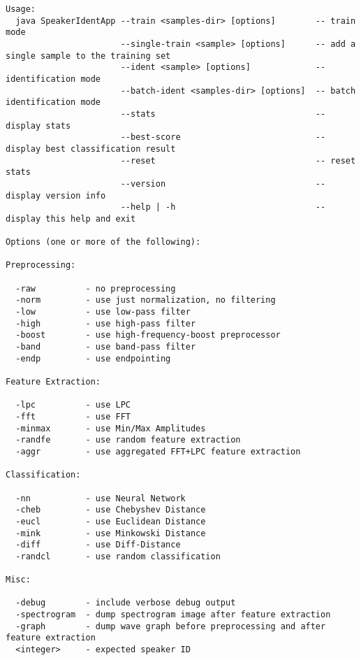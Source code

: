\begin{verbatim}
Usage:
  java SpeakerIdentApp --train <samples-dir> [options]        -- train mode
                       --single-train <sample> [options]      -- add a single sample to the training set
                       --ident <sample> [options]             -- identification mode
                       --batch-ident <samples-dir> [options]  -- batch identification mode
                       --stats                                -- display stats
                       --best-score                           -- display best classification result
                       --reset                                -- reset stats
                       --version                              -- display version info
                       --help | -h                            -- display this help and exit

Options (one or more of the following):

Preprocessing:

  -raw          - no preprocessing
  -norm         - use just normalization, no filtering
  -low          - use low-pass filter
  -high         - use high-pass filter
  -boost        - use high-frequency-boost preprocessor
  -band         - use band-pass filter
  -endp         - use endpointing

Feature Extraction:

  -lpc          - use LPC
  -fft          - use FFT
  -minmax       - use Min/Max Amplitudes
  -randfe       - use random feature extraction
  -aggr         - use aggregated FFT+LPC feature extraction

Classification:

  -nn           - use Neural Network
  -cheb         - use Chebyshev Distance
  -eucl         - use Euclidean Distance
  -mink         - use Minkowski Distance
  -diff         - use Diff-Distance
  -randcl       - use random classification

Misc:

  -debug        - include verbose debug output
  -spectrogram  - dump spectrogram image after feature extraction
  -graph        - dump wave graph before preprocessing and after feature extraction
  <integer>     - expected speaker ID


\end{verbatim}

